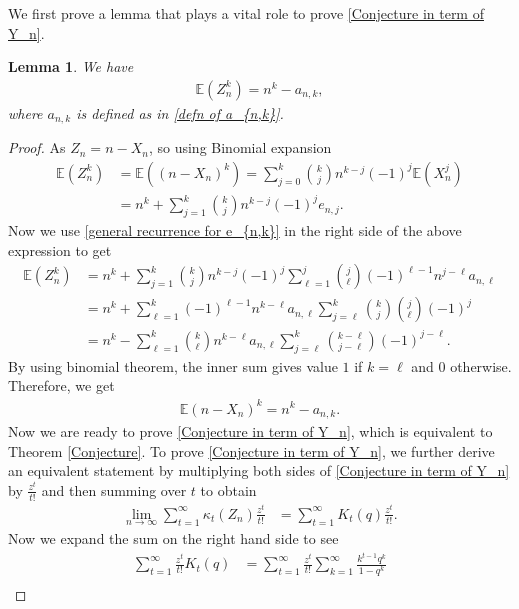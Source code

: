 \documentclass[11pt,reqno]{amsart}
\renewcommand{\(}{\left\(}
\renewcommand{\)}{\right\)}
\renewcommand{\[}{\left\[}
\renewcommand{\]}{\right\]}
\numberwithin{equation}{section}
\theoremstyle{plain}
\newtheorem{lemma}[theorem]{Lemma}
\begin{document}
We first prove a lemma that plays a vital role to prove \eqref{Conjecture in term of Y_n}.  
\begin{lemma}\label{lem1}
We have
\begin{align*}
\mathbb{E}(Z_n^k) = n^k - a_{n,k},
\end{align*}
where $a_{n,k}$ is defined as in \eqref{defn of a_{n,k}}.
\end{lemma}
\begin{proof}
As $Z_n= n-X_n$, so using Binomial expansion
\begin{align}\label{centeredmoment1}
\mathbb{E}(Z_n^k) &=\mathbb{E}\left((n-X_n)^k\right) = \sum_{j=0}^k \binom{k}{j} n^{k-j}(-1)^j\mathbb{E}( X_n^j) \nonumber \\
&= n^k + \sum_{j=1}^k \binom{k}{j} n^{k-j}(-1)^je_{n,j}.        
\end{align}
Now we use \eqref{general recurrence for e_{n,k}} in the right side of the above expression to get
\begin{align*}
\mathbb{E}(Z_n^k) &= n^k + \sum_{j=1}^k \binom{k}{j} n^{k-j}(-1)^j \sum_{\ell=1}^j \binom{j}{\ell}(-1)^{\ell-1} n^{j-\ell}a_{n,\ell} \nonumber \\
&=n^k+ \sum_{\ell=1}^k (-1)^{\ell-1} n^{k-\ell}a_{n,\ell}\sum_{j=\ell}^k \binom{k}{j}\binom{j}{\ell} (-1)^j \nonumber \\
&=n^k - \sum_{\ell=1}^k {k \choose \ell} n^{k-\ell}a_{n,\ell}\sum_{j=\ell}^k  {k-\ell \choose j-\ell} (-1)^{j-\ell}.
\end{align*}
By using binomial theorem, the inner sum gives value $1$ if $k=\ell$ and $0$ otherwise. Therefore, we get 
\begin{align*}
\mathbb{E}(n-X_n)^k = n^k-a_{n,k}.
\end{align*}
Now we are ready to prove \eqref{Conjecture in term of Y_n},  which is equivalent to Theorem \ref{Conjecture}.  To prove \eqref{Conjecture in term of Y_n}, we further derive an equivalent statement by multiplying both sides of \eqref{Conjecture in term of Y_n} by $\frac{z^t}{t!}$ and then summing over $t$ to obtain
\begin{align}\label{cgfy}
\lim_{n\to\infty} \sum_{t= 1}^\infty \kappa_t(Z_n) \frac{z^t}{t!} &=  \sum_{t= 1}^\infty K_{t}(q) \frac{z^t}{t!}.
\end{align}
Now we expand the sum on the right hand side to see
\begin{align}\label{cgf1}
\sum_{t= 1}^\infty \frac{z^t}{t!} K_{t}(q) &=  \sum_{t= 1}^\infty \frac{z^t}{t!} \sum_{k=1}^\infty \frac{k^{t-1}q^k}{1-q^k} \nonumber \\

\end{align}
\end{proof}
\end{document}

